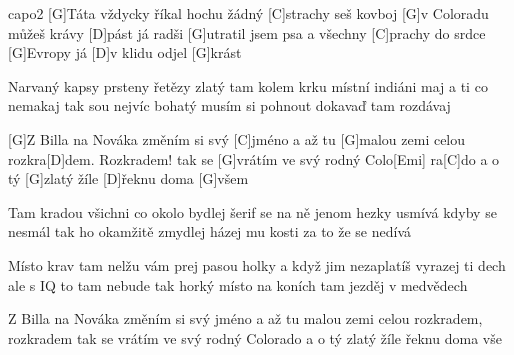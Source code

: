 \hfill capo2
[G]Táta vždycky říkal hochu žádný [C]strachy
seš kovboj [G]v Coloradu můžeš krávy [D]pást
já radši [G]utratil jsem psa a všechny [C]prachy
do srdce [G]Evropy já [D]v klidu odjel [G]krást

Narvaný kapsy prsteny řetězy zlatý
tam kolem krku místní indiáni maj
a ti co nemakaj tak sou nejvíc bohatý
musím si pohnout dokavaď tam rozdávaj

[G]Z Billa na Nováka změním si svý [C]jméno
a až tu [G]malou zemi celou rozkra[D]dem. Rozkradem!
tak se [G]vrátím ve svý rodný Colo[Emi] ra[C]do
a o tý [G]zlatý žíle [D]\null řeknu doma [G]všem


	Tam kradou všichni co okolo bydlej
	šerif se na ně jenom hezky usmívá
	kdyby se nesmál tak ho okamžitě zmydlej
	házej mu kosti za to že se nedívá
	
	Místo krav tam nelžu vám prej pasou holky
	a když jim nezaplatíš vyrazej ti dech
	ale s IQ to tam nebude tak horký
	místo na koních tam jezděj v medvědech

	Z Billa na Nováka změním si svý jméno
	a až tu malou zemi celou rozkradem, rozkradem
	tak se vrátím ve svý rodný Colorado
	a o tý zlatý žíle řeknu doma vše